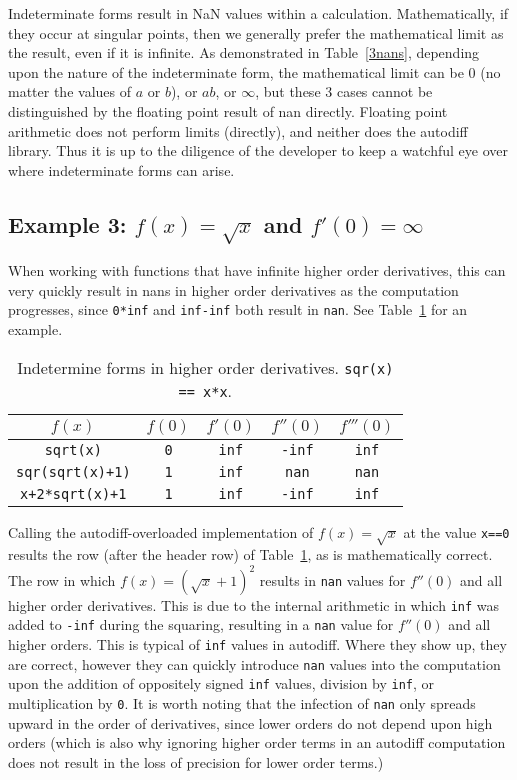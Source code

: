 \documentclass{article}
\begin{document}
Indeterminate forms result in NaN values within a calculation. Mathematically, if they occur at singular points, then
we generally prefer the mathematical limit as the result, even if it is infinite. As demonstrated in Table~\ref{3nans},
depending upon the nature of the indeterminate form, the mathematical limit can be 0 (no matter the values of
$a$ or $b$), or $ab$, or $\infty$, but these 3 cases cannot be distinguished by the floating point result of nan
directly. Floating point arithmetic does not perform limits (directly), and neither does the autodiff library.
Thus it is up to the diligence of the developer to keep a watchful eye over where indeterminate forms can arise.

\subsection{Example 3: $f(x)=\sqrt x$ and $f'(0)=\infty$}

When working with functions that have infinite higher order derivatives, this can very quickly result in nans in
higher order derivatives as the computation progresses, since {\tt 0*inf} and {\tt inf-inf} both result in {\tt nan}.
See Table~\ref{sqrtnan} for an example.

\begin{table}[h]
\centering\begin{tabular}{c||c|c|c|c}
$f(x)$ & $f(0)$ & $f'(0)$ & $f''(0)$ & $f'''(0)$ \\
\hline\hline
{\tt sqrt(x)} & {\tt 0} & {\tt inf} & {\tt -inf} & {\tt inf} \\
\hline
{\tt sqr(sqrt(x)+1)} & {\tt 1} & {\tt inf} & {\tt nan} & {\tt nan} \\
\hline
{\tt x+2*sqrt(x)+1} & {\tt 1} & {\tt inf} & {\tt -inf}& {\tt inf}
\end{tabular}
\caption{Indetermine forms in higher order derivatives. {\tt sqr(x) == x*x}.}\label{sqrtnan}
\end{table}

Calling the autodiff-overloaded implementation of $f(x)=\sqrt x$ at the value {\tt x==0} results the 
row (after the header row) of Table~\ref{sqrtnan}, as is mathematically correct. The  row in which
$f(x)=(\sqrt{x}+1)^2$ results in {\tt nan} values for $f''(0)$ and all higher order derivatives. This is due
to the internal arithmetic in which {\tt inf} was added to {\tt -inf} during the squaring, resulting in a
{\tt nan} value for $f''(0)$ and all higher orders. This is typical of {\tt inf} values in autodiff. Where they
show up, they are correct, however they can quickly introduce {\tt nan} values into the computation upon the
addition of oppositely signed {\tt inf} values, division by {\tt inf}, or multiplication by {\tt 0}. It is
worth noting that the infection of {\tt nan} only spreads upward in the order of derivatives, since lower
orders do not depend upon high orders (which is also why ignoring higher order terms in an autodiff computation
does not result in the loss of precision for lower order terms.)
\end{document}
